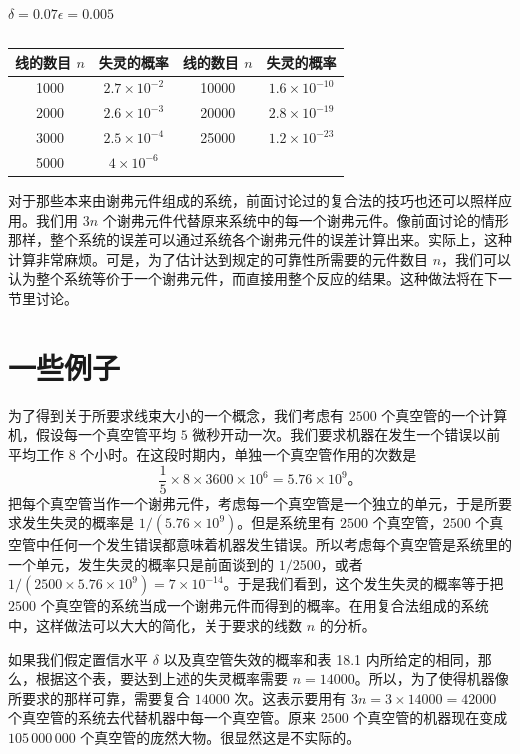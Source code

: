 \begin{table}
\centering
\caption{}   
\mbox{$\delta=0.07 \epsilon = 0.005$}\\  
\label{table_18_1}
\begin{tabular}{cccc}
\toprule
线的数目 $n$ & 失灵的概率 & 线的数目 $n$ & 失灵的概率 \\
\midrule
1000 & $2.7\times10^{-2}$ & 10000 & $1.6\times10^{-10}$ \\
2000 & $2.6\times10^{-3}$ & 20000 & $2.8\times10^{-19}$ \\
3000 & $2.5\times10^{-4}$ & 25000 & $1.2\times10^{-23}$ \\
5000 & $4\times10^{-6}$ & & \\
\bottomrule
\end{tabular}
\end{table}

对于那些本来由谢弗元件组成的系统，前面讨论过的复合法的技巧也还可以照样应用。我们用 $3n$ 个谢弗元件代替原来系统中的每一个谢弗元件。像前面讨论的情形那样，整个系统的误差可以通过系统各个谢弗元件的误差计算出来。实际上，这种计算非常麻烦。可是，为了估计达到规定的可靠性所需要的元件数目 $n$，我们可以认为整个系统等价于一个谢弗元件，而直接用整个反应的结果。这种做法将在下一节里讨论。

\section{一些例子}

为了得到关于所要求线束大小的一个概念，我们考虑有 $2500$ 个真空管的一个计算机，假设每一个真空管平均 $5$ 微秒开动一次。我们要求机器在发生一个错误以前平均工作 $8$ 个小时。在这段时期内，单独一个真空管作用的次数是
\begin{equation*}
\frac{1}{5}\times 8\times 3600\times 10^6 = 5.76\times 10^9。
\end{equation*}
把每个真空管当作一个谢弗元件，考虑每一个真空管是一个独立的单元，于是所要求发生失灵的概率是 $1/(5.76\times10^9)$。但是系统里有 $2500$ 个真空管，$2500$ 个真空管中任何一个发生错误都意味着机器发生错误。所以考虑每个真空管是系统里的一个单元，发生失灵的概率只是前面谈到的 $1/2500$，或者 $1/(2500\times 5.76\times 10^9)=7\times10^{-14}$。于是我们看到，这个发生失灵的概率等于把 $2500$ 个真空管的系统当成一个谢弗元件而得到的概率。在用复合法组成的系统中，这样做法可以大大的简化，关于要求的线数 $n$ 的分析。

如果我们假定置信水平 $\delta$ 以及真空管失效的概率和表 18.1 内所给定的相同，那么，根据这个表，要达到上述的失灵概率需要 $n=14000$。所以，为了使得机器像所要求的那样可靠，需要复合 $14000$ 次。这表示要用有 $3n=3\times14000=42000$ 个真空管的系统去代替机器中每一个真空管。原来 $2500$ 个真空管的机器现在变成 $105\,000\,000$ 个真空管的庞然大物。很显然这是不实际的。

